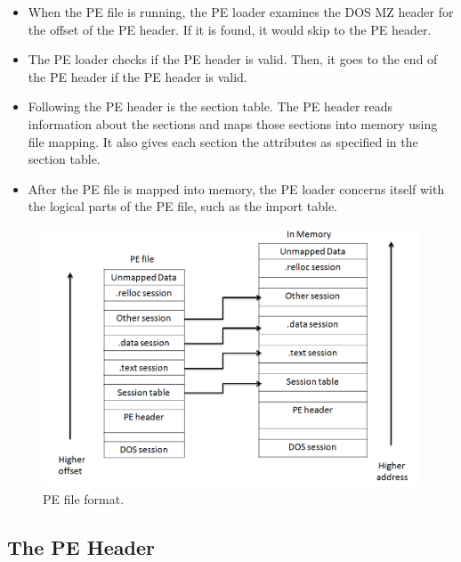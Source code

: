 \begin{itemize}
\item When the PE file is running, the PE loader examines the DOS MZ header for the offset of the PE header. If it is found, it would skip to the PE header.
\item The PE loader checks if the PE header is valid. Then, it goes to the end of the PE header if the PE header is valid.
\item Following the PE header is the section table. The PE header reads information about the sections and maps those sections into memory using file mapping. It also gives each section the attributes as specified in the section table.
\item After the PE file is mapped into memory, the PE loader concerns itself with the logical parts of the PE file, such as the import table.
\end{itemize}
\begin{figure}[h!]
\centering
\includegraphics[width=1\textwidth]{graph/pe1.png}
\caption{PE file format.}
\label{fig:pe1}
\end{figure}


\subsection{The PE Header}


